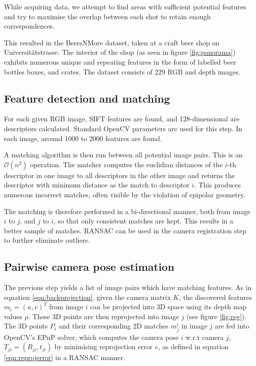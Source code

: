 \documentclass[10pt,twocolumn,letterpaper]{article}
\begin{document}
While acquiring data, we attempt to find areas with sufficient potential
features and try to maximise the overlap between each shot to retain enough
correspondences.

This resulted in the BeersNMore dataset, taken at a craft beer shop on
Universit\"atstrasse. The interior of the shop (as seen in figure \ref{fig:panorama}) exhibits
numerous unique and repeating features in the form of labelled beer bottles
boxes, and crates. The dataset consists of 229 RGB and depth images.




\subsection{Feature detection and matching}\label{sec:extractfeature}

For each given RGB image, SIFT features are found, and 128-dimensional are
descriptors calculated. Standard OpenCV parameters are used for this step.
In each image, around 1000 to 2000 features are found.

A matching algorithm is then run between all potential image pairs. This is
an $\mathcal{O}(n^2)$ operation. The matcher computes the euclidian distances of the $i$-th descriptor in one image to all descriptors in the other image and returns the descriptor with minimum distance as the match to descriptor $i$. This produces numerous
incorrect matches, often visible by the violation of epipolar geometry.

The matching is therefore performed in a bi-directional manner, both from image
$i$ to $j$, and $j$ to $i$, so that only consistent matches are kept. This results in a better sample of matches. RANSAC
can be used in the camera registration step to further eliminate outliers.




\subsection{Pairwise camera pose estimation}

The previous step yields a list of image pairs which have matching features.
As in equation \ref{eqn:backprojection}, given the camera matrix $K$, the discovered features $m_{i} = (u,v)^{T}$ from image $i$ can be projected into 3D space
using its depth map values $\rho$. These 3D points are then reprojected into image $j$ (see figure \ref{fig:reg}). The 3D points $P_{i}$ and their corresponding 2D matches $m^i_{j}$ in image $j$ are fed into OpenCV's EPnP solver, which computes the camera pose $i$ w.r.t camera $j$, $T_{ji} = \left(R_{ji}, t_{ji}\right)$ by minimising reprojection error $e$, as defined in equation \ref{eqn:reprojerror} in a RANSAC manner.
\end{document}
